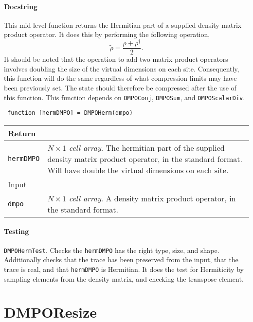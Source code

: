  \paragraph{Docstring} This mid-level function returns the Hermitian part of a supplied density matrix product operator. It does this by performing the following operation,
 \begin{equation}
 \tilde{\rho} = \frac{\rho + \rho^{\dagger}}{2}.
 \label{eq:vs3-2}
 \end{equation}
 It should be noted that the operation to add two matrix product operators involves doubling the size of the virtual dimensions on each site. Consequently, this function will do the same regardless of what compression limits may have been previously set. The state should therefore be compressed after the use of this function. This function depends on \lstinline$DMPOConj$, \lstinline$DMPOSum$, and \lstinline$DMPOScalarDiv$.
 \begin{lstlisting}
 function [hermDMPO] = DMPOHerm(dmpo) \end{lstlisting}
 \begin{longtabu}{X[1,l]X[4,l]}
 \hline
 Return & \\ \hline
 \lstinline$hermDMPO$ & \emph{\(N \times 1\) cell array}. The hermitian part of the supplied density matrix product operator, in the standard format. Will have double the virtual dimensions on each site. \\ \hline
 Input & \\ \hline
 \lstinline$dmpo$ & \emph{\(N \times 1\) cell array}. A density matrix product operator, in the standard format. \\
 \hline
 \end{longtabu}
 \paragraph{Testing} \lstinline$DMPOHermTest$. Checks the \lstinline$hermDMPO$ has the right type, size, and shape. Additionally checks that the trace has been preserved from the input, that the trace is real, and that \lstinline$hermDMPO$ is Hermitian. It does the test for Hermiticity by sampling elements from the density matrix, and checking the transpose element.

 \section{DMPOResize}
